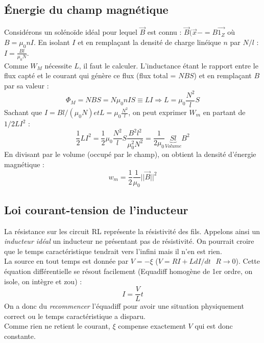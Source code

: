 \documentclass	[11pt, a4paper, openany]{book}
\begin{document}
\subsection{Énergie du champ magnétique}
Considérons un solénoïde idéal pour lequel $\vec{B}$ est connu : $\vec{B}(\vec{x}- = B\vec{1_Z}$ où $B = \mu_0nI$. En isolant $I$ et en remplaçant la densité de charge linéique $n$ par $N/l$ : $I = \frac{Bl}{\mu_0N}$.\\

Comme $W_M$ nécessite $L$, il faut le calculer. L'inductance étant le rapport entre le flux capté et le courant qui génère ce flux (flux total = $NBS$) et en remplaçant $B$ par sa valeur : 
\begin{equation}
\Phi_M = NBS = N\mu_0nIS \equiv LI \Rightarrow L = \mu_0\frac{N^2}{l}S
\end{equation}
Sachant que $I = Bl / (\mu_0N) et L = \mu_0\frac{N^2}{l}$, on peut exprimer $W_m$ en partant de $1/2LI^2$ :
\begin{equation}
\frac{1}{2}LI^2 = \frac{1}{2}\mu_0\frac{N^2}{l}S\frac{B^2l^2}{\mu_0^2N^2} = \frac{1}{2\mu_0}\underbrace{Sl}_{Volume}B^2
\end{equation}
En divisant par le volume (occupé par le champ), on obtient la densité d'énergie magnétique : 
\begin{equation}
w_m = \frac{1}{2}\frac{1}{\mu_0}||\vec{B}||^2
\end{equation}

\subsection{Loi courant-tension de l'inducteur}
La résistance sur les circuit RL représente la résistivité des fils. Appelons ainsi un \textit{inducteur idéal} un inducteur ne présentant pas de résistivité. On pourrait croire que le temps caractéristique tendrait vers l'infini mais il n'en est rien.\\
La source en tout temps est donnée par $V = -\xi$ ($V = RI + L dI/dt \ \ \ R \rightarrow 0$). Cette équation différentielle se résout facilement (Equadiff homogène de 1er ordre, on isole, on intègre et zou) : 
\begin{equation}
I = \frac{V}{L}t
\end{equation}
On a donc du \textit{recommencer} l'équadiff pour avoir une situation physiquement correct ou le temps caractéristique a disparu.\\
Comme rien ne retient le courant, $\xi$ compense exactement $V$ qui est donc constante.
\end{document}
